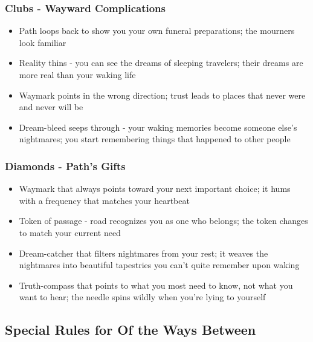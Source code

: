 \documentclass[11pt]{article}
\begin{document}
\subsubsection{Clubs - Wayward Complications}

\begin{itemize}
\item Path loops back to show you your own funeral preparations; the mourners look familiar
\item Reality thins - you can see the dreams of sleeping travelers; their dreams are more real than your waking life
\item Waymark points in the wrong direction; trust leads to places that never were and never will be
\item Dream-bleed seeps through - your waking memories become someone else's nightmares; you start remembering things that happened to other people
\end{itemize}

\subsubsection{Diamonds - Path's Gifts}

\begin{itemize}
\item Waymark that always points toward your next important choice; it hums with a frequency that matches your heartbeat
\item Token of passage - road recognizes you as one who belongs; the token changes to match your current need
\item Dream-catcher that filters nightmares from your rest; it weaves the nightmares into beautiful tapestries you can't quite remember upon waking
\item Truth-compass that points to what you most need to know, not what you want to hear; the needle spins wildly when you're lying to yourself
\end{itemize}

\subsection{Special Rules for Of the Ways Between}
\end{document}
